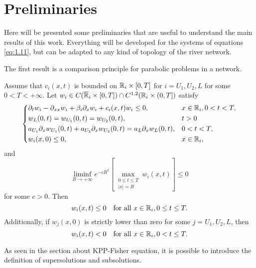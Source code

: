 \section{Preliminaries}
Here will be presented some preliminaries that are useful to understand the main results of this work. Everything will be developed for the systems of equations \ref{eq:1.11}, but can be adapted to any kind of topology of the river network.

The first result is a comparison principle for parabolic problems in a network.
\begin{lemma}
    Assume that \(c_i(x,t)\) is bounded on \(\mathbb{R}_i \times [0, T]\) for \(i = U_1, U_2, L\) for some \(0 < T < +\infty\). Let \(w_i \in C(\overline{\mathbb{R}}_i \times [0, T]) \cap C^{1,2}(\mathbb{R}_i \times (0, T])\) satisfy
    \begin{equation*}
        \begin{dcases}
            \partial_t w_i - \partial_{xx} w_i + \beta_i \partial_x w_i + c_i(x,t)w_i \leq 0, & x \in \mathbb{R}_i, 0 < t < T, \\
            w_L(0, t) = w_{U_1}(0, t) = w_{U_2}(0, t), & t > 0 \\
            a_{U_1} \partial_x w_{U_1}(0, t) + a_{U_2} \partial_x w_{U_2}(0, t) = a_L \partial_x w_L(0, t), & 0 < t < T, \\
            w_i(x, 0) \leq 0, & x \in \mathbb{R}_i,
        \end{dcases}
    \end{equation*}
    and 
    \begin{equation}
        \liminf_{R \to +\infty} e^{-cR^2}\left[\max_{\substack{0\leq t\leq T \\ \lvert x \rvert = R}} w_i(x,t)\right] \leq 0
        \label{eq:2.1}
    \end{equation}
    for some \(c > 0\). Then
    \[
        w_i(x,t) \leq 0 \quad \text{for all } x \in \mathbb{R}_i, 0 \leq t \leq T.
    \]
    Additionally, if \(w_j(x,0)\) is strictly lower than zero for some \(j = U_1, U_2, L\), then
    \begin{equation*}
        w_i(x,t) < 0 \quad \text{for all } x \in \mathbb{R}_i, 0 < t \leq T.
    \end{equation*}
    \label{lem:2.1}
\end{lemma}
As seen in the section about KPP-Fisher equation, it is possible to introduce the definition of supersolutions and subsolutions.
